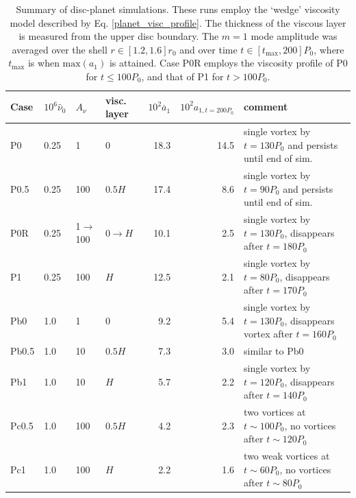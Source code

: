 \begin{table}
  \centering
  \caption{Summary of disc-planet simulations. These runs employ the
    `wedge' viscosity model described by
    Eq. \ref{planet_visc_profile}. The thickness of the viscous layer
    is measured from the upper disc boundary. The $m=1$ mode amplitude was 
    averaged over the shell $r\in[1.2,1.6]r_0$ and over time 
    $t\in[t_\mathrm{max},200]P_0$, where $t_\mathrm{max}$ is when
    $\mathrm{max}(a_1)$ is attained. Case P0R employs the
    viscosity profile of P0 for $t\leq100P_0$, and that of P1 for 
    $t>100P_0$.\label{planet_sims}}
    \begin{tabular}{llllrrl}
      \hline\hline
      Case & $10^6\hat{\nu}_0$ & $A_\nu$ & visc. layer&
      $10^2\overline{a}_1$&$10^2a_{1,t=200P_0}$ & comment \\ 
      \hline
      P0     & 0.25  & 1            & 0     & 18.3  & 14.5 & single vortex
       by $t=130P_0$ and persists until end of sim.  \\ %
      P0.5   & 0.25  & 100          & $0.5H$ &  17.4  & 8.6& single vortex
      by $t=90P_0$ and persists until end of sim.\\ 
      P0R    & 0.25  & 1$\to$100    & $0\to H$& 10.1 & 2.5& single vortex
      by $t=130P_0$, disappears after $t=180P_0$ \\
      P1     & 0.25  & 100          & $H$    & 12.5  & 2.1 &single vortex
      by $t=80P_0$, disappears after $t=170P_0$ \\   %
      

      Pb0     & 1.0  & 1          & 0      & 9.2  & 5.4 &single vortex by $t=130P_0$, disappears
      vortex after $t=160P_0$   \\ %
      Pb0.5   & 1.0  & 10         & $0.5H$ & 7.3  & 3.0 &similar to Pb0     \\ 
      Pb1     & 1.0  & 10         & $H$    & 5.7  & 2.2   &single vortex
      by $t=120P_0$, disappears after $t=140P_0$   \\ %

      Pc0.5   & 1.0  & 100          & $0.5H$ & 4.2  &  2.3 &two vortices
      at $t\sim100P_0$, no vortices after $t\sim120P_0$   \\ %
      Pc1     & 1.0  & 100          & $H$    & 2.2 &  1.6 &two weak vortices at
      $t\sim60P_0$, no vortices after $t\sim 80P_0$\\ %
      \hline
  \end{tabular}
\end{table}


